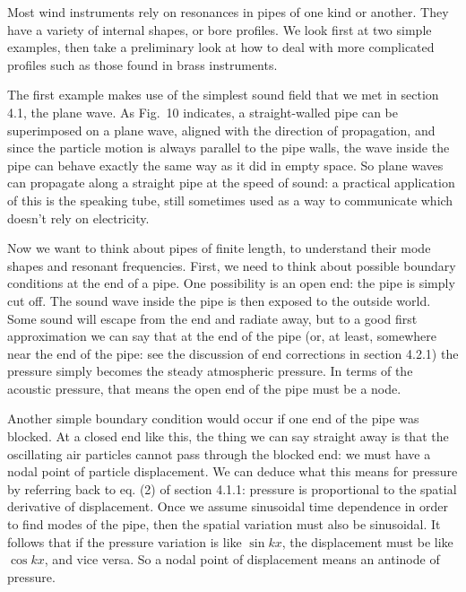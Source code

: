 

  Most wind instruments rely on resonances in pipes of one kind or another. 
  They have a variety of internal shapes, or bore profiles. We look first at 
  two simple examples, then take a preliminary look at how to deal with more 
  complicated profiles such as those found in brass instruments. 

  The first example makes use of the simplest sound field that we met in 
  section 4.1, the plane wave. As Fig.\ 10 indicates, a straight-walled pipe 
  can be superimposed on a plane wave, aligned with the direction of 
  propagation, and since the particle motion is always parallel to the pipe 
  walls, the wave inside the pipe can behave exactly the same way as it did in 
  empty space. So plane waves can propagate along a straight pipe at the speed 
  of sound: a practical application of this is the speaking tube, still 
  sometimes used as a way to communicate which doesn't rely on electricity. 


  Now we want to think about pipes of finite length, to understand their mode 
  shapes and resonant frequencies. First, we need to think about possible 
  boundary conditions at the end of a pipe. One possibility is an open end: the 
  pipe is simply cut off. The sound wave inside the pipe is then exposed to the 
  outside world. Some sound will escape from the end and radiate away, but to a 
  good first approximation we can say that at the end of the pipe (or, at 
  least, somewhere near the end of the pipe: see the discussion of end 
  corrections in section 4.2.1) the pressure simply becomes the steady 
  atmospheric pressure. In terms of the acoustic pressure, that means the open 
  end of the pipe must be a node. 

  Another simple boundary condition would occur if one end of the pipe was 
  blocked. At a closed end like this, the thing we can say straight away is 
  that the oscillating air particles cannot pass through the blocked end: we 
  must have a nodal point of particle displacement. We can deduce what this 
  means for pressure by referring back to eq. (2) of section 4.1.1: pressure is 
  proportional to the spatial derivative of displacement. Once we assume 
  sinusoidal time dependence in order to find modes of the pipe, then the 
  spatial variation must also be sinusoidal. It follows that if the pressure 
  variation is like $\sin kx$, the displacement must be like $\cos kx$, and 
  vice versa. So a nodal point of displacement means an antinode of pressure. 

